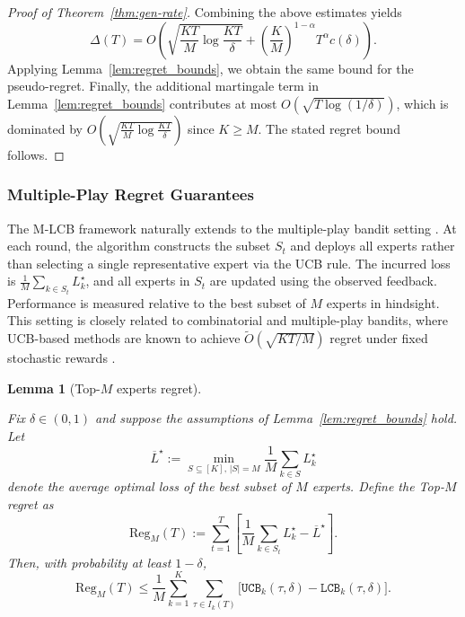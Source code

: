 \documentclass[a4paper,14pt]{extarticle}
\theoremstyle{plain}
\newtheorem{lemma}{Lemma}
\newcommand{\algname}[1]{{\textsf  #1}}
\newcommand{\LCB}{\texttt{LCB}}
\newcommand{\UCB}{\texttt{UCB}}
\begin{document}
\begin{proof}[Proof of Theorem~\ref{thm:gen-rate}]
Combining the above estimates yields
\begin{equation}
\Delta(T)
=
O\!\left(
\sqrt{\frac{KT}{M}\log\frac{KT}{\delta}}
+
\left(\frac{K}{M}\right)^{1-\alpha}
T^\alpha c(\delta)
\right).
\end{equation}
Applying Lemma~\ref{lem:regret_bounds}, we obtain the same bound for the pseudo-regret. Finally, the additional martingale term in
Lemma~\ref{lem:regret_bounds} contributes at most
$ O\!\left( \sqrt{T\log(1/\delta)} \right)$, which is dominated by $ O\!\left( \sqrt{\frac{KT}{M}\log\frac{KT}{\delta}} \right)$
since $K\ge M$. The stated regret bound follows.
\end{proof}

\subsubsection{Multiple-Play Regret Guarantees}

\label{sec:multiple_play}

The \algname{M-LCB} framework naturally extends to the multiple-play bandit setting \cite{agrawal1990multi,uchiya2010algorithms}.
At each round, the algorithm constructs the subset $S_t$ and deploys all experts rather than selecting a single representative expert via the UCB rule. The incurred loss is $\frac1M\sum_{k\in S_t}L_k^\star$, and all experts in $S_t$ are updated using the observed feedback. Performance is measured relative to the best subset of $M$ experts in hindsight. This setting is closely related to combinatorial and multiple-play bandits, where UCB-based methods are known to achieve $\widetilde O(\sqrt{KT/M})$ regret under fixed stochastic rewards \cite{kveton2015tight}.

\begin{lemma}[Top-$M$ experts regret]
\label{prop:m_mean_regret}

Fix $\delta\in(0,1)$ and suppose the assumptions of
Lemma~\ref{lem:regret_bounds} hold. Let
\[
\overline L^\star
:=
\min_{S\subseteq[K],\,|S|=M}
\frac1M\sum_{k\in S}L_k^\star
\]
denote the average optimal loss of the best subset of $M$ experts.
Define the Top-$M$ regret as
\[
\mathrm{Reg}_M(T)
:=
\sum_{t=1}^{T}
\left[
\frac1M\sum_{k\in S_t}L_k^\star
-
\overline L^\star
\right].
\]
Then, with probability at least $1-\delta$,
\[
\mathrm{Reg}_M(T)
\le
\frac1M
\sum_{k=1}^{K}
\sum_{\tau\in I_k(T)}
\bigl[
\UCB_k(\tau,\delta)
-
\LCB_k(\tau,\delta)
\bigr].
\]

\end{lemma}
\end{document}
